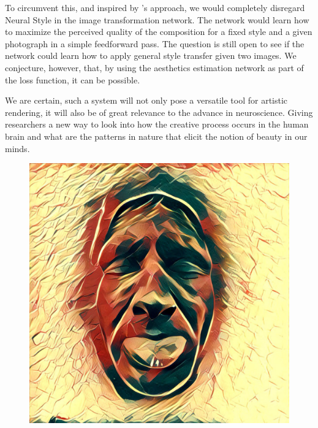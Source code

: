 To circumvent this, and inspired by \cite{Johnson2016}'s approach, we would completely disregard Neural Style in the image transformation network.
The network would learn how to maximize the perceived quality of the composition for a fixed style and a given photograph in a simple feedforward pass.
The question is still open to see if the network could learn how to apply general style transfer given two images.
We conjecture, however, that, by using the aesthetics estimation network as part of the loss function, it can be possible.

We are certain, such a system will not only pose a versatile tool for artistic rendering, it will also be of great relevance to the advance in neuroscience.
Giving researchers a new way to look into how the creative process occurs in the human brain and what are the patterns in nature that elicit the notion of beauty in our minds.

\begin{figure}[!b]
  \includegraphics[width=\textwidth]{gfx/prisma}
\end{figure}
